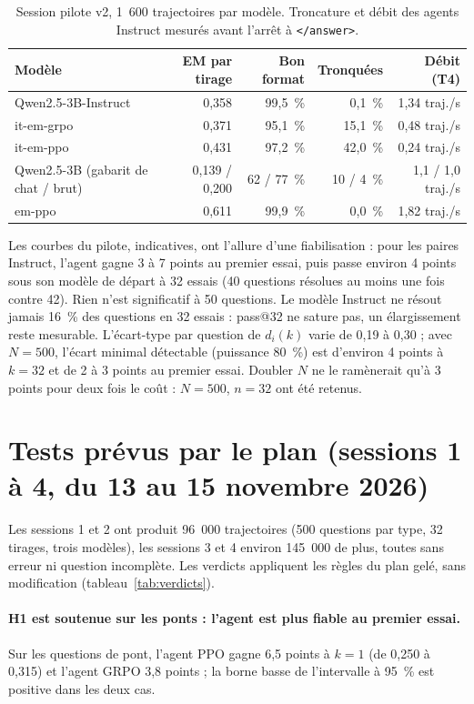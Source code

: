 \documentclass[11pt,a4paper]{article}
\begin{document}
\begin{table}[h]\centering\small
\begin{tabular}{lrrrr}\toprule
Modèle & EM par tirage & Bon format & Tronquées & Débit (T4)\\\midrule
Qwen2.5-3B-Instruct & 0,358 & 99,5~\% & 0,1~\% & 1,34 traj./s\\
\quad it-em-grpo & 0,371 & 95,1~\% & 15,1~\% & 0,48 traj./s\\
\quad it-em-ppo & 0,431 & 97,2~\% & 42,0~\% & 0,24 traj./s\\
Qwen2.5-3B (gabarit de chat / brut) & 0,139 / 0,200 & 62 / 77~\% & 10 / 4~\% & 1,1 / 1,0 traj./s\\
\quad em-ppo & 0,611 & 99,9~\% & 0,0~\% & 1,82 traj./s\\\bottomrule
\end{tabular}
\caption{Session pilote v2, 1~600 trajectoires par modèle. Troncature et débit des agents Instruct mesurés avant l'arrêt à \texttt{</answer>}.}
\label{tab:pilote}\end{table}

Les courbes du pilote, indicatives, ont l'allure d'une fiabilisation : pour les paires Instruct, l'agent gagne 3 à 7 points au premier essai, puis passe environ 4 points sous son modèle de départ à 32 essais (40 questions résolues au moins une fois contre 42). Rien n'est significatif à 50 questions. Le modèle Instruct ne résout jamais 16~\% des questions en 32 essais : pass@32 ne sature pas, un élargissement reste mesurable. L'écart-type par question de $d_i(k)$ varie de 0,19 à 0,30 ; avec $N = 500$, l'écart minimal détectable (puissance 80~\%) est d'environ 4 points à $k = 32$ et de 2 à 3 points au premier essai. Doubler $N$ ne le ramènerait qu'à 3 points pour deux fois le coût : $N = 500$, $n = 32$ ont été retenus.

\section{Tests prévus par le plan (sessions 1 à 4, du 13 au 15 novembre 2026)}\label{sec:tests-p2}

Les sessions 1 et 2 ont produit 96~000 trajectoires (500 questions par type, 32 tirages, trois modèles), les sessions 3 et 4 environ 145~000 de plus, toutes sans erreur ni question incomplète. Les verdicts appliquent les règles du plan gelé, sans modification (tableau~\ref{tab:verdicts}).

\paragraph{H1 est soutenue sur les ponts : l'agent est plus fiable au premier essai.} Sur les questions de pont, l'agent PPO gagne 6,5 points à $k = 1$ (de 0,250 à 0,315) et l'agent GRPO 3,8 points ; la borne basse de l'intervalle à 95~\% est positive dans les deux cas.
\end{document}
